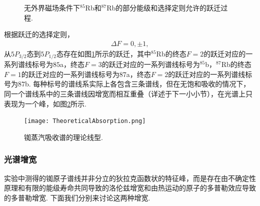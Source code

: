 \documentclass[a4paper, 10pt]{article}
\begin{document}
\begin{multicols}{2}
\begin{figure}[H]
    \centering
    \caption{无外界磁场条件下$^{85}$Rb和$^{87}$Rb的部分能级和选择定则允许的跃迁过程.}
    \label{energy-state}
\end{figure}

根据跃迁的选择定则，
\begin{align}
    \Delta F=0,\pm 1,
\end{align}
从$5P_{3/2}$态到$5P_{1/2}$态存在如图\ref{energy-state}所示的跃迁，其中$^{85}$Rb的终态$F=2$的跃迁对应的一系列谱线标号为$85$a，终态$F=3$的跃迁对应的一系列谱线标号为$^{85}$b，$^{87}$Rb的终态$F=1$的跃迁对应的一系列谱线标号为$87$a，终态$F=2$的跃迁对应的一系列谱线标号为$87$b. 每种标号的谱线系实际上各包含三条谱线，但在无饱和吸收的情况下，同一个谱线系中的三条谱线因增宽而相互重叠（详述于下一小小节），在光谱上只表现为一个峰，如图\ref{theoretical-absorption}所示.

\begin{figure}[H]
    \centering
    \texttt{[image: TheoreticalAbsorption.png]}
    \caption{铷蒸汽吸收谱的理论线型.}
    \label{theoretical-absorption}
\end{figure}

\subsubsection{光谱增宽}
实验中测得的铷原子谱线并非分立的狄拉克函数状的特征峰，而是存在由不确定性原理和有限的能级寿命共同导致的洛伦兹增宽和由热运动的原子的多普勒效应导致的多普勒增宽. 下面我们分别来讨论这两种增宽.


\end{multicols}
\end{document}
